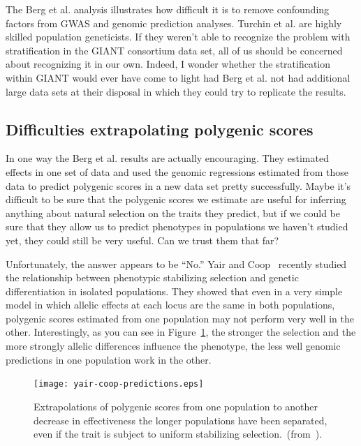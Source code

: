 \documentclass[12pt]{article}
\begin{document}
The Berg et al. analysis illustrates how difficult it is to remove
confounding factors from GWAS and genomic prediction
analyses. Turchin et al. are highly skilled population geneticists. If
they weren't able to recognize the problem with stratification in the
GIANT consortium data set, all of us should be concerned about
recognizing it in our own. Indeed, I wonder whether the stratification
within GIANT would ever have come to light had Berg et al. not had
additional large data sets at their disposal in which they could try
to replicate the results.

\subsection*{Difficulties extrapolating polygenic scores}

In one way the Berg et al. results are actually encouraging. They
estimated effects in one set of data and used the genomic regressions
estimated from those data to predict polygenic scores in a new data
set pretty successfully. Maybe it's difficult to be sure that the
polygenic scores we estimate are useful for inferring anything about
natural selection on the traits they predict, but if we could be sure
that they allow us to predict phenotypes in populations we haven't
studied yet, they could still be very useful. Can we trust them that
far?

Unfortunately, the answer appears to be ``No.'' Yair and
Coop~\cite{Yair-Coop-2022} recently studied the relationship between
phenotypic stabilizing selection and genetic differentiation in
isolated populations. They showed that even in a very simple model in
which allelic effects at each locus are the same in both populations,
polygenic scores estimated from one population may not perform very
well in the other. Interestingly, as you can see in
Figure~\ref{fig:yair-coop-predictions}, the stronger the selection and
the more strongly allelic differences influence the phenotype, the less
well genomic predictions in one population work in the other.

\begin{figure}
  \begin{center}
    \texttt{[image: yair-coop-predictions.eps]}
  \end{center}
  \caption{Extrapolations of polygenic scores from one population to
    another decrease in effectiveness the longer populations have been
    separated, even if the trait is subject to uniform stabilizing
    selection.~(from~\cite{Yair-Coop-2021}).}\label{fig:yair-coop-predictions} 
\end{figure}
\end{document}
